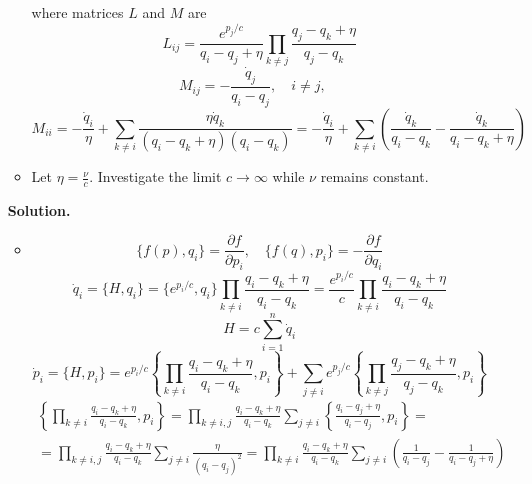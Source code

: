\documentclass[12pt]{article}
\theoremstyle{definition}
\begin{document}
\begin{enumerate}
\begin{itemize}
        where matrices $L$ and $M$ are
        \begin{equation}
            L_{ij}=\frac{e^{p_j/c}}{q_i-q_j+\eta}\prod_{k\neq j}\frac{q_j-q_k+\eta}{q_j-q_k}
        \end{equation}
        \begin{equation}
            M_{ij}=-\frac{\dot{q}_j}{q_i-q_j},\quad i\neq j,\quad 
        \end{equation}
        \begin{equation}
            M_{ii}=-\frac{\dot{q}_i}{\eta}+\sum\limits_{k\neq i}\frac{\eta\dot{q}_k}{(q_i-q_k+\eta)(q_i-q_k)}=-\frac{\dot{q}_i}{\eta}+\sum\limits_{k\neq i}\left(\frac{\dot{q}_k}{q_i-q_k}-\frac{\dot{q}_k}{q_i-q_k+\eta}\right)
        \end{equation}
        \item Let $\eta=\frac{\nu}{c}$. Investigate the limit $c\rightarrow\infty$ while $\nu$ remains constant.
    \end{itemize}
    \textbf{Solution.}
    \begin{itemize}
        \item 
        \begin{equation}
            \{f(p),q_i\}=\frac{\partial f}{\partial p_i},\quad \{f(q),p_i\}=-\frac{\partial f}{\partial q_i}
        \end{equation}
        \begin{equation}
            \dot{q}_i=\{H,q_i\}=\{e^{p_i/c},q_i\}\prod\limits_{k\neq i}\frac{q_i-q_k+\eta}{q_i-q_k}=\frac{e^{p_i/c}}{c}\prod\limits_{k\neq i}\frac{q_i-q_k+\eta}{q_i-q_k}
        \end{equation}
        \begin{equation}
            H=c\sum\limits_{i=1}^n\dot{q}_i
        \end{equation}
        \begin{equation}
            \dot{p}_i=\{H,p_i\}=e^{p_i/c}\left\{\prod\limits_{k\neq i}\frac{q_i-q_k+\eta}{q_i-q_k},p_i\right\}+\sum\limits_{j\neq i}e^{p_j/c}\left\{\prod\limits_{k\neq j}\frac{q_j-q_k+\eta}{q_j-q_k},p_i\right\}
        \end{equation}
        \begin{multline}
            \left\{\prod\limits_{k\neq i}\frac{q_i-q_k+\eta}{q_i-q_k},p_i\right\}=\prod\limits_{k\neq i,j}\frac{q_i-q_k+\eta}{q_i-q_k}\sum\limits_{j\neq i}\left\{\frac{q_i-q_j+\eta}{q_i-q_j},p_i\right\}=\\=\prod\limits_{k\neq i,j}\frac{q_i-q_k+\eta}{q_i-q_k}\sum\limits_{j\neq i}\frac{\eta}{(q_i-q_j)^2}=\prod\limits_{k\neq i}\frac{q_i-q_k+\eta}{q_i-q_k}\sum\limits_{j\neq i}\left(\frac{1}{q_i-q_j}-\frac{1}{q_i-q_j+\eta}\right)

\end{multline}
\end{itemize}
\end{enumerate}
\end{document}
